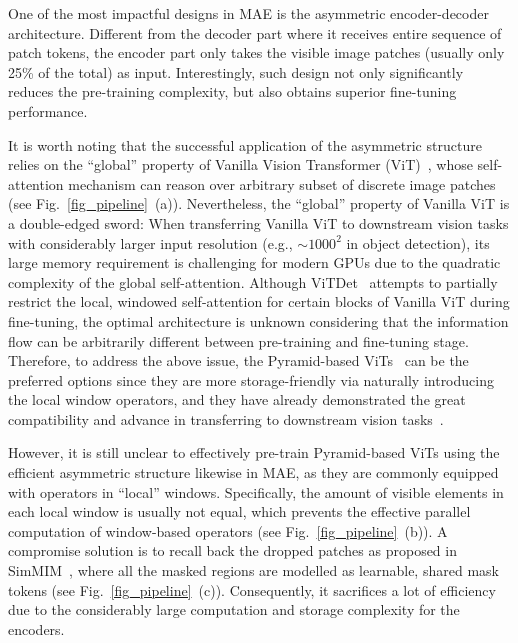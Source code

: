 \documentclass{article}
\begin{document}
One of the most impactful designs in MAE is the asymmetric encoder-decoder architecture. Different from the decoder part where it receives entire sequence of patch tokens, the encoder part only takes the visible image patches (usually only 25\% of the total) as input. Interestingly, such design not only significantly reduces the pre-training complexity, but also obtains superior fine-tuning performance.

It is worth noting that the successful application of the asymmetric structure relies on the ``global'' property of Vanilla Vision Transformer (ViT)~\cite{dosovitskiy2020image}, whose self-attention mechanism can reason over arbitrary subset of discrete image patches (see Fig.~\ref{fig_pipeline}~(a)). Nevertheless, the ``global'' property of Vanilla ViT is a double-edged sword: When transferring Vanilla ViT to downstream vision tasks with considerably larger input resolution (e.g., $\sim 1000^2$ in object detection), its large memory requirement is challenging for modern GPUs due to the quadratic complexity of the global self-attention. Although ViTDet~\cite{li2022exploring,li2021benchmarking} attempts to partially restrict the local, windowed self-attention for certain blocks of Vanilla ViT during fine-tuning, the optimal architecture is unknown considering that the information flow can be arbitrarily different between pre-training and fine-tuning stage. Therefore, to address the above issue, the Pyramid-based ViTs~\cite{liu2021swin,liu2021swinv2,wang2021pyramid,wang2022pvtv2} can be the preferred options since they are more storage-friendly via naturally introducing the local window operators, and they have already demonstrated the great compatibility and advance in transferring to downstream vision tasks~\cite{khan2021transformers}. 


However, it is still unclear to effectively pre-train Pyramid-based ViTs using the efficient asymmetric structure likewise in MAE, as they are commonly equipped with operators in ``local'' windows. Specifically, the amount of visible elements in each local window is usually not equal, which prevents the effective parallel computation of window-based operators (see Fig.~\ref{fig_pipeline}~(b)). A compromise solution is to recall back the dropped patches as proposed in SimMIM~\cite{xie2021simmim}, where all the masked regions are modelled as learnable, shared mask tokens (see Fig.~\ref{fig_pipeline}~(c)). Consequently, it sacrifices a lot of efficiency due to the considerably large computation and storage complexity for the encoders. 
\end{document}
